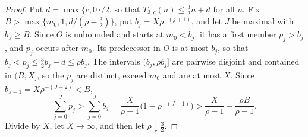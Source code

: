 \documentclass[12pt]{amsart}
\theoremstyle{definition}
\theoremstyle{remark}
\begin{document}
\begin{proof}
Put $d=\max\{c,0\}/2$, so that $T_{3,c}(n)\le\frac32n+d$ for all $n$. Fix $B>\max\{m_0,1,d/(\rho-\frac32)\}$, put $b_j=X\rho^{-(j+1)}$, and let $J$ be maximal with $b_J\ge B$. Since $O$ is unbounded and starts at $m_0<b_j$, it has a first member $p_j>b_j$, and $p_j$ occurs after $m_0$. Its predecessor in $O$ is at most $b_j$, so that $b_j<p_j\le\frac32b_j+d\le\rho b_j$. The intervals $(b_j,\rho b_j]$ are pairwise disjoint and contained in $(B,X]$, so the $p_j$ are distinct, exceed $m_0$ and are at most $X$. Since $b_{J+1}=X\rho^{-(J+2)}<B$,
\[
 \sum_{j=0}^Jp_j>\sum_{j=0}^Jb_j=\frac{X}{\rho-1}\bigl(1-\rho^{-(J+1)}\bigr)>\frac{X}{\rho-1}-\frac{\rho B}{\rho-1}.
\]
Divide by $X$, let $X\to\infty$, and then let $\rho\downarrow\frac32$.
\end{proof}
\end{document}
